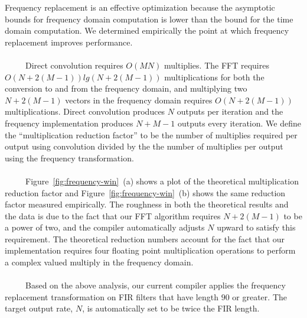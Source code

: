 \begin{figure*}[t]
{Frequency replacement is an effective optimization because the
asymptotic bounds for frequency domain computation is lower than the
bound for the time domain computation.  We determined empirically the
point at which frequency replacement improves performance.
\\ ~ \\
~~~~~Direct convolution requires $O(MN)$ multiplies.  The FFT requires
$O(N+2(M-1))lg(N+2(M-1))$ multiplications for both the conversion to
and from the frequency domain, and multiplying two $N+2(M-1)$ vectors
in the frequency domain requires $O(N+2(M-1))$ multiplications.
Direct convolution produces $N$ outputs per iteration and the
frequency implementation produces $N+M-1$ outputs every iteration.  We
define the ``multiplication reduction factor'' to be the number of
multiplies required per output using convolution divided by the the
number of multiplies per output using the frequency transformation.
\\ ~ \\
~~~~~Figure~\ref{fig:frequency-win}~(a) shows a plot of the theoretical
multiplication reduction factor and Figure~\ref{fig:frequency-win}~(b)
shows the same reduction factor measured empirically.  The roughness
in both the theoretical results and the data is due to the fact that
our FFT algorithm requires $N+2(M-1)$ to be a power of two, and the
compiler automatically adjusts $N$ upward to satisfy this
requirement. The theoretical reduction numbers account for the fact
that our implementation requires four floating point multiplication
operations to perform a complex valued multiply in the frequency
domain.
\\ ~ \\
~~~~~Based on the above analysis, our current compiler applies the
frequency replacement transformation on FIR filters that have length
$90$ or greater. The target output rate, $N$, is automatically set to
be twice the FIR length.
}
\end{figure*}


